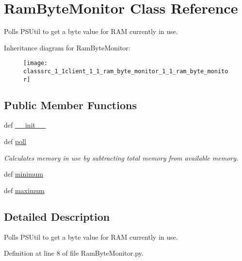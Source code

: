 \hypertarget{classsrc_1_1client_1_1_ram_byte_monitor_1_1_ram_byte_monitor}{\section{Ram\-Byte\-Monitor Class Reference}
\label{classsrc_1_1client_1_1_ram_byte_monitor_1_1_ram_byte_monitor}
}


Polls P\-S\-Util to get a byte value for R\-A\-M currently in use.  


Inheritance diagram for Ram\-Byte\-Monitor\-:\begin{figure}[H]
\begin{center}
\leavevmode
\texttt{[image: classsrc\_1\_1client\_1\_1\_ram\_byte\_monitor\_1\_1\_ram\_byte\_monitor]}
\end{center}
\end{figure}
\subsection*{Public Member Functions}
\begin{DoxyCompactItemize}
\item 
def \hyperlink{classsrc_1_1client_1_1_ram_byte_monitor_1_1_ram_byte_monitor_ac775ee34451fdfa742b318538164070e}{\-\_\-\-\_\-init\-\_\-\-\_\-}
\item 
def \hyperlink{classsrc_1_1client_1_1_ram_byte_monitor_1_1_ram_byte_monitor_a87cd0076a6d482a01482f25a64cf2fb4}{poll}
\begin{DoxyCompactList}\small\item\em Calculates memory in use by subtracting total memory from available memory. \end{DoxyCompactList}\item 
def \hyperlink{classsrc_1_1client_1_1_ram_byte_monitor_1_1_ram_byte_monitor_a4515aa6e0be4391413959391fef1109f}{minimum}
\item 
def \hyperlink{classsrc_1_1client_1_1_ram_byte_monitor_1_1_ram_byte_monitor_a8f6589fdc9d322ec8e0dc2c7ede55ce9}{maximum}
\end{DoxyCompactItemize}


\subsection{Detailed Description}
Polls P\-S\-Util to get a byte value for R\-A\-M currently in use. 

Definition at line 8 of file Ram\-Byte\-Monitor.\-py.



